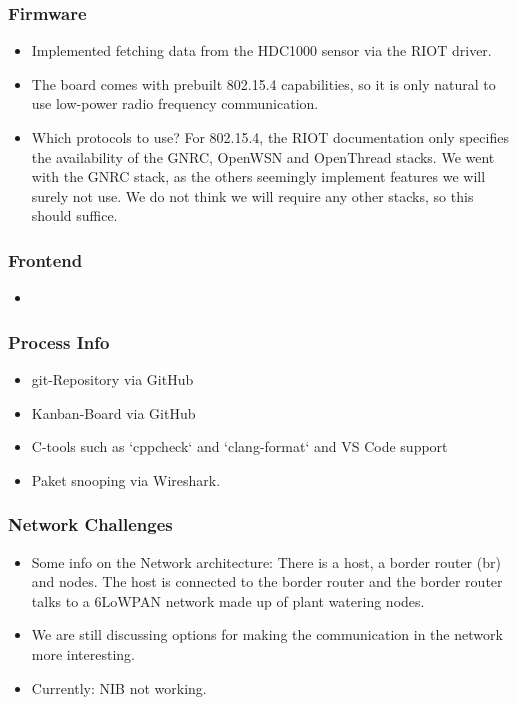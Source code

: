 \documentclass[10pt, xcolor=svgnames]{beamer}
\begin{document}
\begin{frame}
    \frametitle{Firmware}

    \begin{itemize}
        \item Implemented fetching data from the HDC1000 sensor via the RIOT driver.
        \item The board comes with prebuilt 802.15.4 capabilities, so it is only natural to use low-power radio frequency communication.
        \item Which protocols to use? For 802.15.4, the RIOT documentation only specifies the availability of the GNRC, OpenWSN and OpenThread stacks. We went with the GNRC stack, as the others seemingly implement features we will surely not use. We do not think we will require any other stacks, so this should suffice.
    \end{itemize}
\end{frame}

\begin{frame}
    \frametitle{Frontend}

    \begin{itemize}
        \item
    \end{itemize}
\end{frame}

\begin{frame}
    \frametitle{Process Info}

    \begin{itemize}
        \item git-Repository via GitHub
        \item Kanban-Board via GitHub
        \item C-tools such as `cppcheck` and `clang-format` and VS Code support
        \item Paket snooping via Wireshark.
    \end{itemize}
\end{frame}

\begin{frame}
    \frametitle{Network Challenges}

    \begin{itemize}
        \item Some info on the Network architecture: There is a host, a border router (br) and nodes. The host is connected to the border router and the border router talks to a 6LoWPAN network made up of plant watering nodes.
        \item We are still discussing options for making the communication in the network more interesting.
        \item Currently: NIB not working.
    \end{itemize}

\end{frame}
\end{document}
